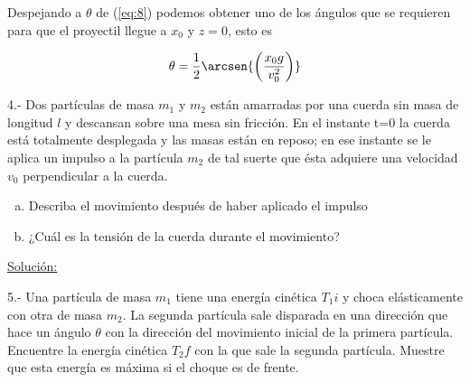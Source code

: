 \documentclass[a4paper,10pt]{article}
\begin{document}
Despejando a $\theta$ de (\ref{eq:8}) podemos obtener uno de los ángulos que se 
requieren para que el proyectil llegue a $x_0$ y $z=0$, esto es


\begin{equation}
 \theta = \frac{1}{2} \arcsen{\left(\frac{x_0 g}{v_0^2}\right)}
 \label{eq:9}
\end{equation}


















\vspace{.3cm}

4.- Dos partículas de masa $m_1$ y $m_2$ están amarradas por una cuerda sin masa de 
longitud $l$ y descansan sobre una mesa sin fricción. En el instante t=0 la cuerda
está totalmente desplegada y las masas están en reposo; en ese instante se le aplica
un impulso a la partícula $m_2$ de tal suerte que ésta adquiere una velocidad $v_0$ 
perpendicular a la cuerda.

\begin{enumerate}[a)]
 \item Describa el movimiento después de haber aplicado el impulso
 \item ¿Cuál es la tensión de la cuerda durante el movimiento?
\end{enumerate}

\vspace{.3cm}

\underline{Solución:}

\vspace{.3cm}

5.- Una partícula de masa $m_1$ tiene una energía cinética $T_1i$ y choca elásticamente 
con otra de masa $m_2$. La segunda partícula sale disparada en una dirección que hace un
ángulo $\theta$ con la dirección del movimiento inicial de la primera partícula. Encuentre
la energía cinética $T_2f$ con la que sale la segunda partícula. Muestre que esta energía
es máxima si el choque es de frente.

\vspace{.3cm}
\end{document}
